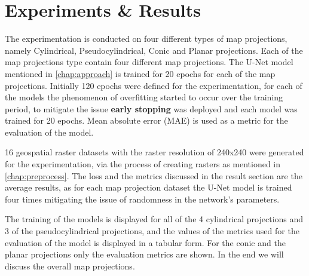 
\clearpage
\cleardoublepage

\chapter{Experiments \& Results}

\label{chap:experiments_results}
The experimentation is conducted on four different types of map projections, namely Cylindrical, Pseudocylindrical, Conic and Planar projections. Each of the map projections type contain four different map projections.
The U-Net model mentioned in \autoref{chap:approach} is trained for 20 epochs for each of the map projections. Initially 120 epochs were defined for the experimentation, for each of the models the phenomenon of overfitting started to occur over the training period, to mitigate the issue \textbf{early stopping} was deployed and each model was trained for 20 epochs.
Mean absolute error (MAE) is used as a metric for the evaluation of the model.

16 geospatial raster datasets with the raster resolution of 240x240 were generated for the experimentation, via the process of creating rasters as mentioned in \autoref{chap:preprocess}. The loss and the metrics discussed in the result section are the average results, as for each map projection dataset the U-Net model is trained four times mitigating the issue of randomness in the network's parameters.

The training of the models is displayed for all of the 4 cylindrical projections and 3 of the pseudocylindrical projections, and the values of the metrics used for the evaluation of the model is displayed in a tabular form.
For the conic and the planar projections only the evaluation metrics are shown. In the end we will discuss the overall map projections.

\clearpage

\clearpage

\clearpage


\clearpage


